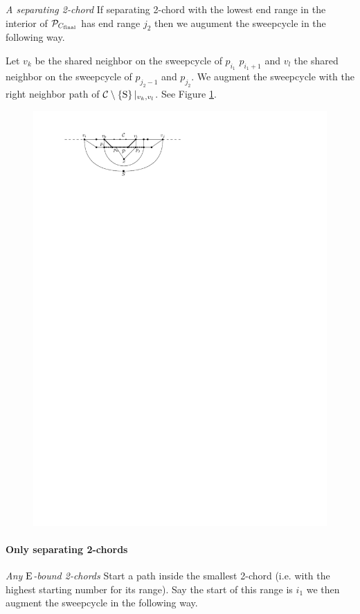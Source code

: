    \emph{A separating 2-chord}
      If separating 2-chord with the lowest end range in the interior of $\P_{C_\text{final}}$ has end range $j_2$ then we augument the sweepcycle in the following way.

      Let $v_k$ be the shared neighbor on the sweepcycle of $p_{i_1}$ $p_{i_1 +1}$ and $v_l$ the shared neighbor on the sweepcycle  of $p_{j_2 -1}$ and $p_{j_2}$. We augment the sweepcycle with the right neighbor path of $\cpath|_{v_k, v_l}$. See Figure \ref{fig:sweep:2chordInChordUpdate}.

    \begin{figure}[h]
      \centering
      \includegraphics[scale=1]{unifiedAlgo/img/2chordInChordUpdate}
      \caption{}
      \label{fig:sweep:2chordInChordUpdate}
    \end{figure}

    \paragraph{Only separating 2-chords}
    \emph{Any $\pE$-bound 2-chords}
    Start a path inside the smallest 2-chord (i.e. with the highest starting number for its range). Say the start of this range is $i_1$ we then augment the sweepcycle in the following way.

